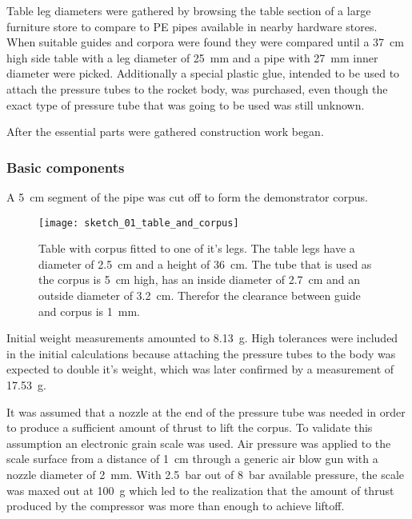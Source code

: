 Table leg diameters were gathered by browsing the table section of a large furniture store to compare to PE pipes available in nearby hardware stores. When suitable guides and corpora were found they were compared until a \SI{37}{\centi\meter} high side table \cite{table} with a leg diameter of \SI{25}{\milli\meter} and a pipe with \SI{27}{\milli\meter} inner diameter were picked. Additionally a special plastic glue, intended to be used to attach the pressure tubes to the rocket body, was purchased, even though the exact type of pressure tube that was going to be used was still unknown.

After the essential parts were gathered construction work began. 

\subsubsection{Basic components}
A \SI{5}{\centi\meter} segment of the pipe was cut off to form the demonstrator corpus.

\begin{figure}[h]
\centering

\texttt{[image: sketch\_01\_table\_and\_corpus]}

\caption{Table with corpus fitted to one of it's legs. The table legs have a diameter of \SI{2,5}{\centi\meter} and a height of \SI{36}{\centi\meter}. The tube that is used as the corpus is \SI{5}{\centi\meter} high, has an inside diameter of \SI{2,7}{\centi\meter} and an outside diameter of \SI{3,2}{\centi\meter}. Therefor the clearance between guide and corpus is \SI{1}{\milli\meter}.}
\end{figure}


Initial weight measurements amounted to \SI{8,13}{\gram}. High tolerances were included in the initial calculations because attaching the pressure tubes to the body was expected to double it's weight, which was later confirmed by a measurement of \SI{17,53}{\gram}.

It was assumed that a nozzle at the end of the pressure tube was needed in order to produce a sufficient amount of thrust to lift the corpus.
To validate this assumption an electronic grain scale was used. Air pressure was applied to the scale surface from a distance of \SI{1}{\centi\meter} through a generic air blow gun with a nozzle diameter of \SI{2}{\milli\meter}. With \SI{2,5}{\bar} out of \SI{8}{\bar} available pressure, the scale was maxed out at \SI{100}{\gram} which led to the realization that the amount of thrust produced by the compressor was more than enough to achieve liftoff. 


